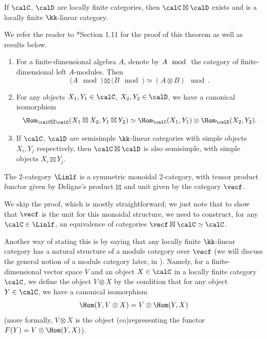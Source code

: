 \begin{theorem}\label{t:deligne-product}
  If $\calC$, $\calD$ are locally finite categories,
  then $\calC\boxtimes \calD$ exists
  and is a locally finite $\kk$-linear category.
\end{theorem}
We refer the reader to *{Section 1.11} for the proof of
this theorem as well as results below.
\begin{lemma}\label{l:deligne-product-mod}
  \begin{enumerate}
  \item
    For a finite-dimensional algebra $A$, denote by $A\mod$ the category of
    finite-dimensional left $A$-modules. Then
    $$
      (A\mod)\boxtimes (B\mod) \simeq (A\otimes B)\mod.
    $$
  \item
    For any objects $X_1, Y_1\in \calC$, $X_2, Y_2\in \calD$, we have a
    canonical isomorphism
    $$
       \Hom_{\calC \boxtimes \calD} (X_1\boxtimes X_2, Y_1\boxtimes Y_2 )\simeq
         \Hom_{\calC} (X_1,  Y_1) \otimes
         \Hom_{\calD} (X_2, Y_2 ).
    $$
  \item If $\calC$, $\calD$ are semisimple $\kk$-linear categories with simple
    objects $X_i, Y_j$ respectively, then $\calC\boxtimes \calD$ is also
    semisimple, with simple objects $X_i\boxtimes Y_j$.
   \end{enumerate}
\end{lemma}

\begin{theorem}\label{t:linear-monoidal-2cat}
  The 2-category $\Linlf$ is a symmetric monoidal 2-category, with tensor
  product functor given by Deligne's product $\boxtimes$ and unit given by the
  category $\vecf$.
\end{theorem}
We skip the proof, which is mostly straightforward; we just note that to show
that $\vecf$ is the unit for this monoidal structure, we need to construct,
for any $\calC\in \Linlf$, an equivalence of categories $\vecf\boxtimes
\calC\simeq \calC$.

Another way of stating this is by saying that any locally finite $\kk$-linear
category has a natural structure of a module category over $\vecf$ (we will
discuss the general notion of a module category later, in
). Namely, for a
finite-dimensional vector space $V$ and an object $X\in \calC$ in a locally
finite category $\calC$, we define the object $V\otimes X$ by the condition that
for any object $Y\in \calC$, we have a canonical isomorphism
$$
  \Hom(Y, V\otimes X)=V\otimes \Hom(Y, X)
$$
(more formally, $V\otimes X$ is the object (co)representing the functor
$F(Y)=V\otimes \Hom(Y,X)$).

\clearpage
